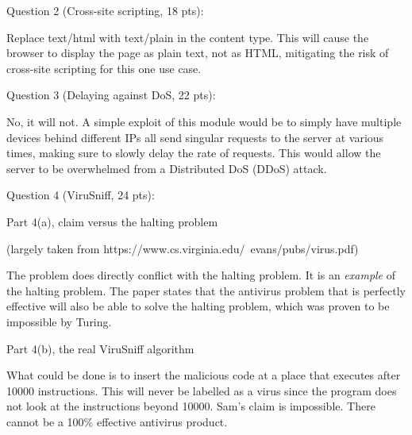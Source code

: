 \documentclass[11pt]{article}
\begin{document}
\newpage

Question 2 (Cross-site scripting, 18 pts):

Replace text/html with text/plain in the content type. This will cause the browser to display the page as plain text, not as HTML, mitigating the risk of cross-site scripting for this one use case.

\vspace{3.5in}

Question 3 (Delaying against DoS, 22 pts):

No, it will not. A simple exploit of this module would be to simply have multiple devices behind different IPs all send singular requests to the server at various times, making sure to slowly delay the rate of requests. This would allow the server to be overwhelmed from a Distributed DoS (DDoS) attack.

\newpage

Question 4 (ViruSniff, 24 pts):

Part 4(a), claim versus the halting problem

(largely taken from https://www.cs.virginia.edu/~evans/pubs/virus.pdf)

The problem does directly conflict with the halting problem. It is an \emph{example} of the halting problem.
The paper states that the antivirus problem that is perfectly effective will also be able to solve the halting problem, which was proven to be impossible by Turing.

\vspace{3.5in}

Part 4(b), the real ViruSniff algorithm

What could be done is to insert the malicious code at a place that executes after 10000 instructions. This will never be labelled as a virus since the program does not look at the instructions beyond 10000.
Sam's claim is impossible. There cannot be a 100\% effective antivirus product.
\end{document}
